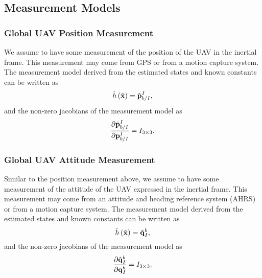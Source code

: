 
\subsection{Measurement Models}

\subsubsection{Global UAV Position Measurement}
We assume to have some measurement of the position of the UAV in the inertial
frame. This measurement may come from GPS or from a motion capture system.
The measurement model derived from the estimated states and known constants can
be written as
\begin{equation}
  \hat{h} \left( \hat{\boldsymbol{\mathrm{x}}} \right) = \hat{\boldsymbol{\mathrm{p}}}_{b/I}^I,
\end{equation}
and the non-zero jacobians of the measurement model as
\begin{equation}
  \frac{\partial \hat{\boldsymbol{\mathrm{p}}}_{b/I}^I}{\partial \boldsymbol{\mathrm{p}}_{b/I}^I} = I_{3
  \times 3}.
\end{equation}

\subsubsection{Global UAV Attitude Measurement}
Similar to the position measurement above, we assume to have some measurement of
the attitude of the UAV expressed in the inertial frame. This measurement may
come from an attitude and heading reference system (AHRS) or from a motion
capture system. 
The measurement model derived from the estimated states and known constants can
be written as
\begin{equation}
  \hat{h} \left( \hat{\boldsymbol{\mathrm{x}}} \right) = \hat{\boldsymbol{\mathrm{q}}}_{I}^b,
\end{equation}
and the non-zero jacobians of the measurement model as
\begin{equation}
  \frac{\partial \hat{\boldsymbol{\mathrm{q}}}_{I}^b}{\partial \boldsymbol{\mathrm{q}}_{I}^b} = I_{3
  \times 3}.
\end{equation}

